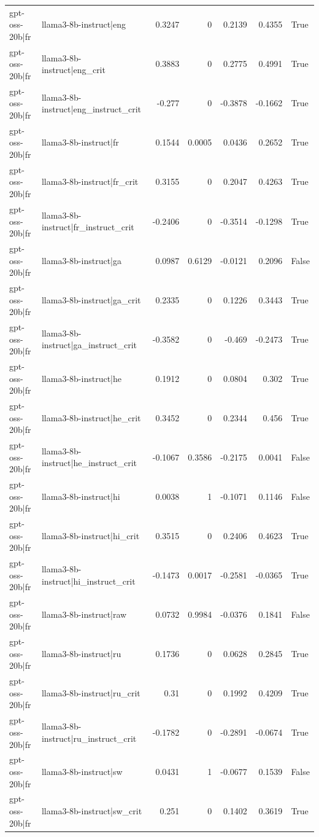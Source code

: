 \begin{table}
\begin{tabular}{l l r r r r l}
gpt-oss-20b|fr & llama3-8b-instruct|eng & 0.3247 & 0 & 0.2139 & 0.4355 & True \\
gpt-oss-20b|fr & llama3-8b-instruct|eng_crit & 0.3883 & 0 & 0.2775 & 0.4991 & True \\
gpt-oss-20b|fr & llama3-8b-instruct|eng_instruct_crit & -0.277 & 0 & -0.3878 & -0.1662 & True \\
gpt-oss-20b|fr & llama3-8b-instruct|fr & 0.1544 & 0.0005 & 0.0436 & 0.2652 & True \\
gpt-oss-20b|fr & llama3-8b-instruct|fr_crit & 0.3155 & 0 & 0.2047 & 0.4263 & True \\
gpt-oss-20b|fr & llama3-8b-instruct|fr_instruct_crit & -0.2406 & 0 & -0.3514 & -0.1298 & True \\
gpt-oss-20b|fr & llama3-8b-instruct|ga & 0.0987 & 0.6129 & -0.0121 & 0.2096 & False \\
gpt-oss-20b|fr & llama3-8b-instruct|ga_crit & 0.2335 & 0 & 0.1226 & 0.3443 & True \\
gpt-oss-20b|fr & llama3-8b-instruct|ga_instruct_crit & -0.3582 & 0 & -0.469 & -0.2473 & True \\
gpt-oss-20b|fr & llama3-8b-instruct|he & 0.1912 & 0 & 0.0804 & 0.302 & True \\
gpt-oss-20b|fr & llama3-8b-instruct|he_crit & 0.3452 & 0 & 0.2344 & 0.456 & True \\
gpt-oss-20b|fr & llama3-8b-instruct|he_instruct_crit & -0.1067 & 0.3586 & -0.2175 & 0.0041 & False \\
gpt-oss-20b|fr & llama3-8b-instruct|hi & 0.0038 & 1 & -0.1071 & 0.1146 & False \\
gpt-oss-20b|fr & llama3-8b-instruct|hi_crit & 0.3515 & 0 & 0.2406 & 0.4623 & True \\
gpt-oss-20b|fr & llama3-8b-instruct|hi_instruct_crit & -0.1473 & 0.0017 & -0.2581 & -0.0365 & True \\
gpt-oss-20b|fr & llama3-8b-instruct|raw & 0.0732 & 0.9984 & -0.0376 & 0.1841 & False \\
gpt-oss-20b|fr & llama3-8b-instruct|ru & 0.1736 & 0 & 0.0628 & 0.2845 & True \\
gpt-oss-20b|fr & llama3-8b-instruct|ru_crit & 0.31 & 0 & 0.1992 & 0.4209 & True \\
gpt-oss-20b|fr & llama3-8b-instruct|ru_instruct_crit & -0.1782 & 0 & -0.2891 & -0.0674 & True \\
gpt-oss-20b|fr & llama3-8b-instruct|sw & 0.0431 & 1 & -0.0677 & 0.1539 & False \\
gpt-oss-20b|fr & llama3-8b-instruct|sw_crit & 0.251 & 0 & 0.1402 & 0.3619 & True \\

\end{tabular}
\end{table}
